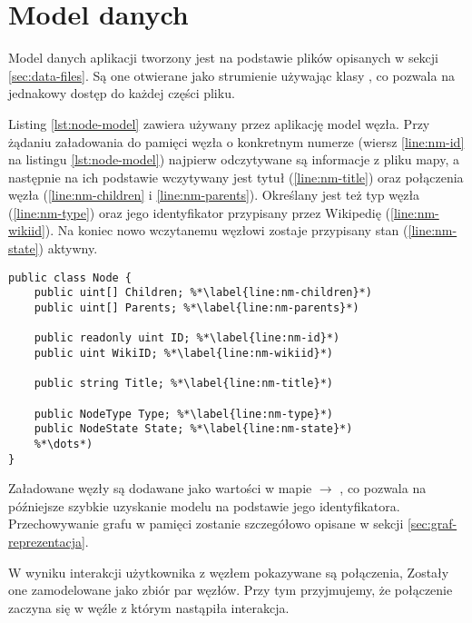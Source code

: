 \section{Model danych}

Model danych aplikacji tworzony jest na podstawie plików opisanych w sekcji \ref{sec:data-files}. Są one otwierane jako strumienie używając klasy , co pozwala na jednakowy dostęp do każdej części pliku. 

Listing \ref{lst:node-model} zawiera używany przez aplikację model węzła. Przy żądaniu załadowania do pamięci węzła o konkretnym numerze (wiersz \ref{line:nm-id} na listingu \ref{lst:node-model}) najpierw odczytywane są informacje z pliku mapy, a następnie na ich podstawie wczytywany jest tytuł (\ref{line:nm-title}) oraz połączenia węzła (\ref{line:nm-children} i \ref{line:nm-parents}). Określany jest też typ węzła (\ref{line:nm-type}) oraz jego identyfikator przypisany przez Wikipedię (\ref{line:nm-wikiid}). Na koniec nowo wczytanemu węzłowi zostaje przypisany stan (\ref{line:nm-state}) aktywny.
\begin{lstlisting}[caption={Model węzła grafu}, label=lst:node-model]
public class Node {
	public uint[] Children; %*\label{line:nm-children}*)
	public uint[] Parents; %*\label{line:nm-parents}*)

	public readonly uint ID; %*\label{line:nm-id}*)
	public uint WikiID; %*\label{line:nm-wikiid}*)

	public string Title; %*\label{line:nm-title}*)

	public NodeType Type; %*\label{line:nm-type}*)
	public NodeState State; %*\label{line:nm-state}*)
	%*\dots*)
}
\end{lstlisting}

Załadowane węzły są dodawane jako wartości w mapie  $\rightarrow$ , co pozwala na późniejsze szybkie uzyskanie modelu na podstawie jego identyfikatora. Przechowywanie grafu w pamięci zostanie szczegółowo opisane w sekcji \ref{sec:graf-reprezentacja}.

W wyniku interakcji użytkownika z węzłem pokazywane są połączenia, Zostały one zamodelowane jako zbiór par węzłów. Przy tym przyjmujemy, że połączenie zaczyna się w węźle z którym nastąpiła interakcja.
